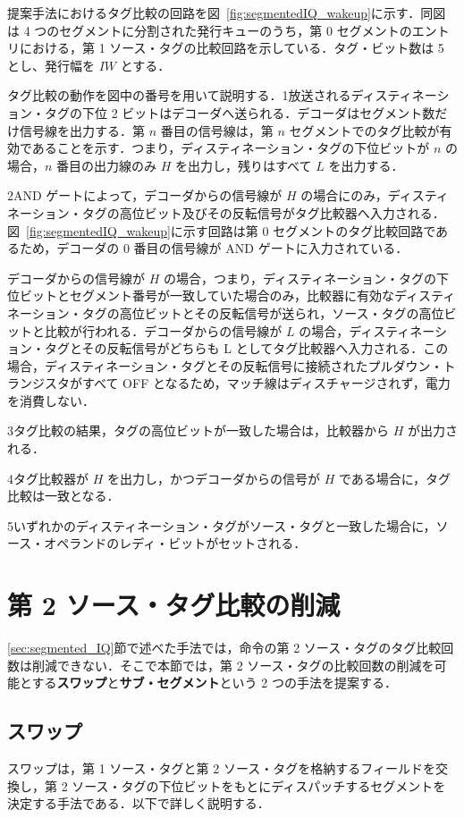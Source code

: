 \documentclass[submit,techrep,noauthor]{ipsj}
\newcommand{\fig}[1]{{図~\ref{fig:#1}}}
\newcommand{\ctext}[1]{\textcircled{\scriptsize{#1}}}
\begin{document}
提案手法におけるタグ比較の回路を\fig{segmentedIQ_wakeup}に示す．同図は 4 つのセグメントに分割された発行キューのうち，第 0 セグメントのエントリにおける，第 1 ソース・タグの比較回路を示している．タグ・ビット数は 5 とし、発行幅を $IW$ とする．

タグ比較の動作を図中の番号を用いて説明する．\ctext{1}放送されるディスティネーション・タグの下位 2 ビットはデコーダへ送られる．デコーダはセグメント数だけ信号線を出力する．第 $n$ 番目の信号線は，第 $n$ セグメントでのタグ比較が有効であることを示す．つまり，ディスティネーション・タグの下位ビットが $n$ の場合，$n$ 番目の出力線のみ $H$ を出力し，残りはすべて $L$ を出力する．

\ctext{2}AND ゲートによって，デコーダからの信号線が $H$ の場合にのみ，ディスティネーション・タグの高位ビット及びその反転信号がタグ比較器へ入力される．\fig{segmentedIQ_wakeup}に示す回路は第 0 セグメントのタグ比較回路であるため，デコーダの 0 番目の信号線が AND ゲートに入力されている．

デコーダからの信号線が $H$ の場合，つまり，ディスティネーション・タグの下位ビットとセグメント番号が一致していた場合のみ，比較器に有効なディスティネーション・タグの高位ビットとその反転信号が送られ，ソース・タグの高位ビットと比較が行われる．デコーダからの信号線が $L$ の場合，ディスティネーション・タグとその反転信号がどちらも L としてタグ比較器へ入力される．この場合，ディスティネーション・タグとその反転信号に接続されたプルダウン・トランジスタがすべて OFF となるため，マッチ線はディスチャージされず，電力を消費しない．

\ctext{3}タグ比較の結果，タグの高位ビットが一致した場合は，比較器から $H$ が出力される．

\ctext{4}タグ比較器が $H$ を出力し，かつデコーダからの信号が $H$ である場合に，タグ比較は一致となる．

\ctext{5}いずれかのディスティネーション・タグがソース・タグと一致した場合に，ソース・オペランドのレディ・ビットがセットされる．


\section{第 2 ソース・タグ比較の削減}
\label{sec:second_tag_comp}
\ref{sec:segmented_IQ}節で述べた手法では，命令の第 2 ソース・タグのタグ比較回数は削減できない．そこで本節では，第 2 ソース・タグの比較回数の削減を可能とする\textbf{スワップ}と\textbf{サブ・セグメント}という 2 つの手法を提案する．

\subsection{スワップ}
\label{sec:swap}
スワップは，第 1 ソース・タグと第 2 ソース・タグを格納するフィールドを交換し，第 2 ソース・タグの下位ビットをもとにディスパッチするセグメントを決定する手法である．以下で詳しく説明する．
\end{document}
